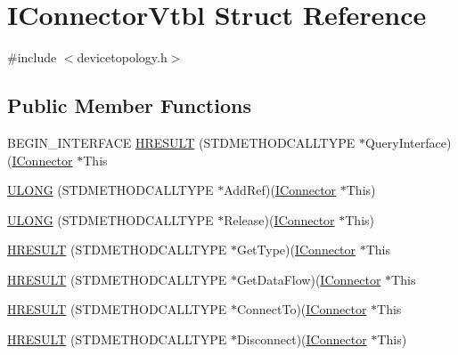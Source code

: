 \hypertarget{struct_i_connector_vtbl}{}\section{I\+Connector\+Vtbl Struct Reference}
\label{struct_i_connector_vtbl}


{\ttfamily \#include $<$devicetopology.\+h$>$}

\subsection*{Public Member Functions}
\begin{DoxyCompactItemize}
\item 
B\+E\+G\+I\+N\+\_\+\+I\+N\+T\+E\+R\+F\+A\+CE \hyperlink{struct_i_connector_vtbl_adcc32e2c45386b3151bdf564e8edc8a6}{H\+R\+E\+S\+U\+LT} (S\+T\+D\+M\+E\+T\+H\+O\+D\+C\+A\+L\+L\+T\+Y\+PE $\ast$Query\+Interface)(\hyperlink{devicetopology_8h_a51f898e3bb3480805837711f3fcf328b}{I\+Connector} $\ast$This
\item 
\hyperlink{struct_i_connector_vtbl_aa29727c0f3b728f41e7d39068d9a1297}{U\+L\+O\+NG} (S\+T\+D\+M\+E\+T\+H\+O\+D\+C\+A\+L\+L\+T\+Y\+PE $\ast$Add\+Ref)(\hyperlink{devicetopology_8h_a51f898e3bb3480805837711f3fcf328b}{I\+Connector} $\ast$This)
\item 
\hyperlink{struct_i_connector_vtbl_a823273baa0d0db2ad08a61dbf2003884}{U\+L\+O\+NG} (S\+T\+D\+M\+E\+T\+H\+O\+D\+C\+A\+L\+L\+T\+Y\+PE $\ast$Release)(\hyperlink{devicetopology_8h_a51f898e3bb3480805837711f3fcf328b}{I\+Connector} $\ast$This)
\item 
\hyperlink{struct_i_connector_vtbl_a8cfe0a17338e4bd92e9a70f5cf7ba802}{H\+R\+E\+S\+U\+LT} (S\+T\+D\+M\+E\+T\+H\+O\+D\+C\+A\+L\+L\+T\+Y\+PE $\ast$Get\+Type)(\hyperlink{devicetopology_8h_a51f898e3bb3480805837711f3fcf328b}{I\+Connector} $\ast$This
\item 
\hyperlink{struct_i_connector_vtbl_a3864216fadeebba0c17161c3185927e8}{H\+R\+E\+S\+U\+LT} (S\+T\+D\+M\+E\+T\+H\+O\+D\+C\+A\+L\+L\+T\+Y\+PE $\ast$Get\+Data\+Flow)(\hyperlink{devicetopology_8h_a51f898e3bb3480805837711f3fcf328b}{I\+Connector} $\ast$This
\item 
\hyperlink{struct_i_connector_vtbl_a0273734c97aa342526f3e8976d1421e0}{H\+R\+E\+S\+U\+LT} (S\+T\+D\+M\+E\+T\+H\+O\+D\+C\+A\+L\+L\+T\+Y\+PE $\ast$Connect\+To)(\hyperlink{devicetopology_8h_a51f898e3bb3480805837711f3fcf328b}{I\+Connector} $\ast$This
\item 
\hyperlink{struct_i_connector_vtbl_af004dba615707b208eab494349649132}{H\+R\+E\+S\+U\+LT} (S\+T\+D\+M\+E\+T\+H\+O\+D\+C\+A\+L\+L\+T\+Y\+PE $\ast$Disconnect)(\hyperlink{devicetopology_8h_a51f898e3bb3480805837711f3fcf328b}{I\+Connector} $\ast$This)

\end{DoxyCompactItemize}
